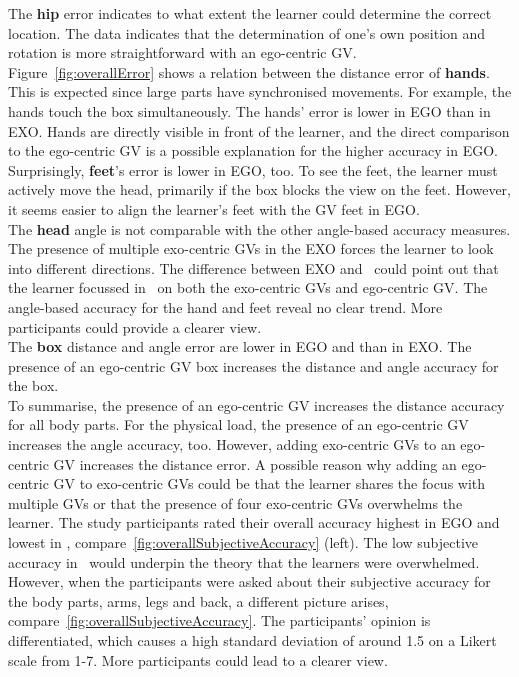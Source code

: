 The \textbf{hip} error indicates to what extent the learner could determine the correct location. The data indicates that the determination of one's own position and rotation is more straightforward with an ego-centric GV.\\
Figure~\ref{fig:overallError} shows a relation between the distance error of \textbf{hands}. This is expected since large parts have synchronised movements. For example, the hands touch the box simultaneously. The hands' error is lower in EGO than in EXO. Hands are directly visible in front of the learner, and the direct comparison to the ego-centric GV is a possible explanation for the higher accuracy in EGO.\\
Surprisingly, \textbf{feet}'s error is lower in EGO, too. To see the feet, the learner must actively move the head, primarily if the box blocks the view on the feet. However, it seems easier to align the learner's feet with the GV feet in EGO.\\
The \textbf{head} angle is not comparable with the other angle-based accuracy measures. The presence of multiple exo-centric GVs in the EXO forces the learner to look into different directions. The difference between EXO and \combi\ could point out that the learner focussed in \combi\ on both the exo-centric GVs and ego-centric GV. The angle-based accuracy for the hand and feet reveal no clear trend. More participants could provide a clearer view.\\
The \textbf{box} distance and angle error are lower in EGO and \combi than in EXO. The presence of an ego-centric GV box increases the distance and angle accuracy for the box.\\

To summarise, the presence of an ego-centric GV increases the distance accuracy for all body parts. For the physical load, the presence of an ego-centric GV increases the angle accuracy, too. However, adding exo-centric GVs to an ego-centric GV increases the distance error. A possible reason why adding an ego-centric GV to exo-centric GVs could be that the learner shares the focus with multiple GVs or that the presence of four exo-centric GVs overwhelms the learner. The study participants rated their overall accuracy highest in EGO and lowest in \combi, compare~\ref{fig:overallSubjectiveAccuracy} (left). The low subjective accuracy in \combi\ would underpin the theory that the learners were overwhelmed. However, when the participants were asked about their subjective accuracy for the body parts, arms, legs and back, a different picture arises, compare~\ref{fig:overallSubjectiveAccuracy}. The participants' opinion is differentiated, which causes a high standard deviation of around 1.5 on a Likert scale from 1-7. More participants could lead to a clearer view.\\

